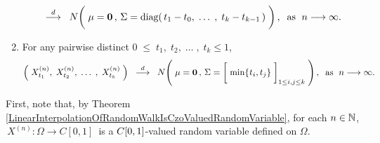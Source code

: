 \begin{theorem}
\begin{enumerate}
\begin{equation*}
		\;\; \overset{d}{\longrightarrow} \;\;
		N\!\left(\;
		\mathbf{\mu} = \mathbf{0}\,,\,
		\overset{{\color{white}1}}{\Sigma} = \diag\!\left(\,t_{1}-t_{0},\; \ldots\; ,\; t_{k}-t_{k-1}\,\right)
		\;\right),
		\;\;
		\textnormal{as \;$n \longrightarrow \infty$}.
		\end{equation*}
\item	For any pairwise distinct \;$0 \;\leq\; t_{1},\; t_{2}, \;\ldots\;,\; t_{k} \leq 1$,
		\begin{equation*}
		\left(\;X^{(n)}_{t_{1}},\; X^{(n)}_{t_{2}}, \;\ldots\;,\; X^{(n)}_{t_{k}}\;\right)
		\;\; \overset{d}{\longrightarrow} \;\;
		N\!\left(\;
		\mathbf{\mu} = \mathbf{0}\,,\,
		\Sigma = \left[\;\min\{\overset{{\color{white}1}}{t}_{i},t_{j}\}\;\right]_{1\leq i,j\leq k}
		\;\right),
		\;\;\textnormal{as \;$n \longrightarrow \infty$}.
		\end{equation*}
\end{enumerate}
\end{theorem}
\proof
First, note that, by
Theorem \ref{LinearInterpolationOfRandomWalkIsCzoValuedRandomVariable},
for each $n \in \mathbb{N}$,
\,$X^{(n)} : \Omega \longrightarrow C[0,1]$\,
is a $C[0,1]$-valued random variable defined on $\Omega$.
